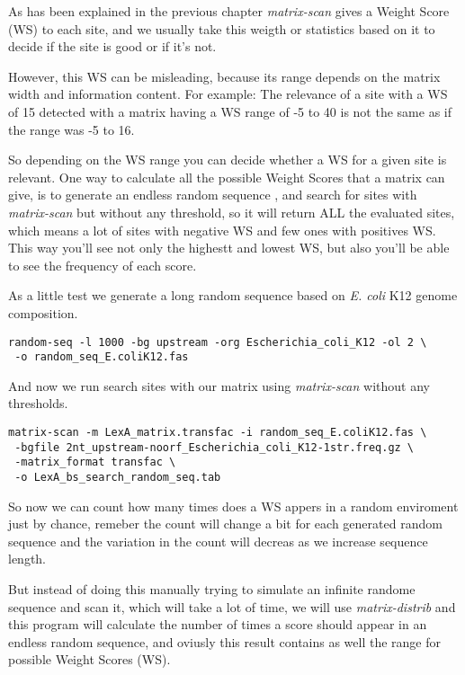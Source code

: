 As has been explained in the previous chapter \textit{matrix-scan}
gives a Weight Score (WS) to each site, and we usually take this weigth or
statistics based on it to decide if the site is good or if it's not.

However, this WS can be misleading, because its range depends on the
matrix width and information content. For example: The relevance of a
site with a WS of 15 detected with a matrix having a WS range of -5 to
40 is not the same as if the range was -5 to 16.

So depending on the WS range you can decide whether a WS for a given
site is relevant. One way to calculate all the possible Weight Scores
that a matrix can give, is to generate an endless random sequence ,
and search for sites with \textit{matrix-scan} but without any
threshold, so it will return ALL the evaluated sites, which means a
lot of sites with negative WS and few ones with positives
WS. This way you'll see not only the highestt and lowest WS, but also
you'll be able to see the frequency of each score.

As a little test we generate a long random sequence based on
\textit{E. coli} K12 genome composition.

{\color{Blue} \begin{footnotesize} 
\begin{verbatim}
random-seq -l 1000 -bg upstream -org Escherichia_coli_K12 -ol 2 \
 -o random_seq_E.coliK12.fas
\end{verbatim} \end{footnotesize}
}

And now we run search sites with our matrix using \textit{matrix-scan}
without any thresholds.

{\color{Blue} \begin{footnotesize}
\begin{verbatim}
matrix-scan -m LexA_matrix.transfac -i random_seq_E.coliK12.fas \
 -bgfile 2nt_upstream-noorf_Escherichia_coli_K12-1str.freq.gz \
 -matrix_format transfac \
 -o LexA_bs_search_random_seq.tab
\end{verbatim} \end{footnotesize} }

So now we can count how many times does a WS appers in a random
enviroment just by chance, remeber the count will change a bit for
each generated random sequence and the variation in the count will decreas as we increase
sequence length.

But instead of doing this manually trying to simulate an infinite
randome sequence and scan it, which will take a lot of time, we will
use \textit{matrix-distrib} and this program will calculate the number
of times a score should appear in an endless random sequence, and
oviusly this result contains as well the range for possible Weight
Scores (WS).

